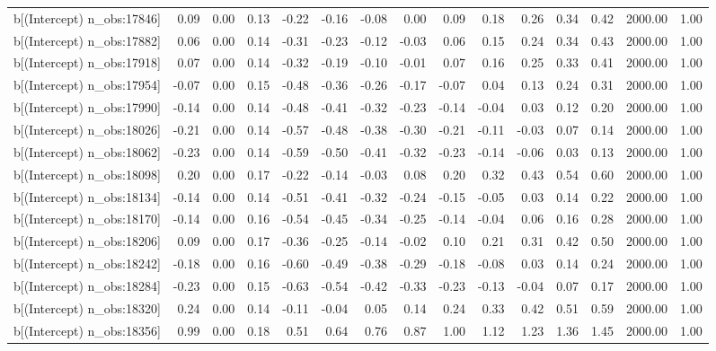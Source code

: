 \begin{table}[ht]
\begin{tabular}{rrrrrrrrrrrrrrr}
  b[(Intercept) n\_obs:17846] & 0.09 & 0.00 & 0.13 & -0.22 & -0.16 & -0.08 & 0.00 & 0.09 & 0.18 & 0.26 & 0.34 & 0.42 & 2000.00 & 1.00 \\ 
  b[(Intercept) n\_obs:17882] & 0.06 & 0.00 & 0.14 & -0.31 & -0.23 & -0.12 & -0.03 & 0.06 & 0.15 & 0.24 & 0.34 & 0.43 & 2000.00 & 1.00 \\ 
  b[(Intercept) n\_obs:17918] & 0.07 & 0.00 & 0.14 & -0.32 & -0.19 & -0.10 & -0.01 & 0.07 & 0.16 & 0.25 & 0.33 & 0.41 & 2000.00 & 1.00 \\ 
  b[(Intercept) n\_obs:17954] & -0.07 & 0.00 & 0.15 & -0.48 & -0.36 & -0.26 & -0.17 & -0.07 & 0.04 & 0.13 & 0.24 & 0.31 & 2000.00 & 1.00 \\ 
  b[(Intercept) n\_obs:17990] & -0.14 & 0.00 & 0.14 & -0.48 & -0.41 & -0.32 & -0.23 & -0.14 & -0.04 & 0.03 & 0.12 & 0.20 & 2000.00 & 1.00 \\ 
  b[(Intercept) n\_obs:18026] & -0.21 & 0.00 & 0.14 & -0.57 & -0.48 & -0.38 & -0.30 & -0.21 & -0.11 & -0.03 & 0.07 & 0.14 & 2000.00 & 1.00 \\ 
  b[(Intercept) n\_obs:18062] & -0.23 & 0.00 & 0.14 & -0.59 & -0.50 & -0.41 & -0.32 & -0.23 & -0.14 & -0.06 & 0.03 & 0.13 & 2000.00 & 1.00 \\ 
  b[(Intercept) n\_obs:18098] & 0.20 & 0.00 & 0.17 & -0.22 & -0.14 & -0.03 & 0.08 & 0.20 & 0.32 & 0.43 & 0.54 & 0.60 & 2000.00 & 1.00 \\ 
  b[(Intercept) n\_obs:18134] & -0.14 & 0.00 & 0.14 & -0.51 & -0.41 & -0.32 & -0.24 & -0.15 & -0.05 & 0.03 & 0.14 & 0.22 & 2000.00 & 1.00 \\ 
  b[(Intercept) n\_obs:18170] & -0.14 & 0.00 & 0.16 & -0.54 & -0.45 & -0.34 & -0.25 & -0.14 & -0.04 & 0.06 & 0.16 & 0.28 & 2000.00 & 1.00 \\ 
  b[(Intercept) n\_obs:18206] & 0.09 & 0.00 & 0.17 & -0.36 & -0.25 & -0.14 & -0.02 & 0.10 & 0.21 & 0.31 & 0.42 & 0.50 & 2000.00 & 1.00 \\ 
  b[(Intercept) n\_obs:18242] & -0.18 & 0.00 & 0.16 & -0.60 & -0.49 & -0.38 & -0.29 & -0.18 & -0.08 & 0.03 & 0.14 & 0.24 & 2000.00 & 1.00 \\ 
  b[(Intercept) n\_obs:18284] & -0.23 & 0.00 & 0.15 & -0.63 & -0.54 & -0.42 & -0.33 & -0.23 & -0.13 & -0.04 & 0.07 & 0.17 & 2000.00 & 1.00 \\ 
  b[(Intercept) n\_obs:18320] & 0.24 & 0.00 & 0.14 & -0.11 & -0.04 & 0.05 & 0.14 & 0.24 & 0.33 & 0.42 & 0.51 & 0.59 & 2000.00 & 1.00 \\ 
  b[(Intercept) n\_obs:18356] & 0.99 & 0.00 & 0.18 & 0.51 & 0.64 & 0.76 & 0.87 & 1.00 & 1.12 & 1.23 & 1.36 & 1.45 & 2000.00 & 1.00 \\ 

\end{tabular}
\end{table}

